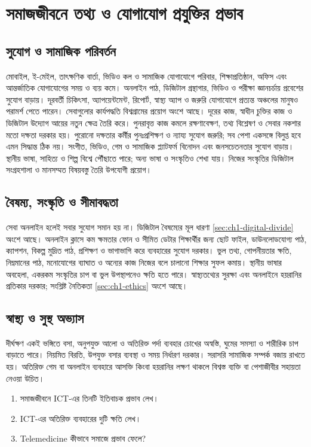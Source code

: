 \section{সমাজজীবনে তথ্য ও যোগাযোগ প্রযুক্তির প্রভাব}
\label{sec:ch1-social}
\subsection{সুযোগ ও সামাজিক পরিবর্তন}
মোবাইল, ই-মেইল, তাৎক্ষণিক বার্তা, ভিডিও কল ও সামাজিক যোগাযোগে পরিবার, শিক্ষাপ্রতিষ্ঠান, অফিস এবং আন্তর্জাতিক যোগাযোগের সময় ও ব্যয় কমে। অনলাইন পাঠ, ডিজিটাল গ্রন্থাগার, ভিডিও ও পরীক্ষা জ্ঞানচর্চায় প্রবেশের সুযোগ বাড়ায়। দূরবর্তী চিকিৎসা, অ্যাপয়েন্টমেন্ট, রিপোর্ট, স্বাস্থ্য অ্যাপ ও জরুরি যোগাযোগে প্রত্যন্ত অঞ্চলের মানুষও পরামর্শ পেতে পারেন। সেবাগুলোর কার্যপদ্ধতি বিশ্বগ্রামের প্রয়োগ অংশে আছে।
দূরের কাজ, স্বাধীন চুক্তির কাজ ও ডিজিটাল উদ্যোগ আয়ের নতুন ক্ষেত্র তৈরি করে। পুনরাবৃত্ত কাজ কমলে রক্ষণাবেক্ষণ, তথ্য বিশ্লেষণ ও সেবার নকশার মতো দক্ষতা দরকার হয়। পুরোনো দক্ষতার কর্মীর পুনঃপ্রশিক্ষণ ও ন্যায্য সুযোগ জরুরি; সব পেশা একসঙ্গে বিলুপ্ত হবে এমন সিদ্ধান্ত ঠিক নয়।
সংগীত, ভিডিও, গেম ও সামাজিক প্ল্যাটফর্ম বিনোদন এবং জনসচেতনতার সুযোগ বাড়ায়। স্থানীয় ভাষা, সাহিত্য ও শিল্প বিশ্বে পৌঁছাতে পারে; অন্য ভাষা ও সংস্কৃতিও শেখা যায়। নিজের সংস্কৃতির ডিজিটাল সংগ্রহশালা ও মানসম্মত বিষয়বস্তু তৈরি উপযোগী প্রয়োগ।
\subsection{বৈষম্য, সংস্কৃতি ও সীমাবদ্ধতা}
সেবা অনলাইন হলেই সবার সুযোগ সমান হয় না। ডিজিটাল বৈষম্যের মূল ধারণা \ref{sec:ch1-digital-divide} অংশে আছে। অনলাইন ক্লাসে কম ক্ষমতার ফোন ও সীমিত ডেটার শিক্ষার্থীর জন্য ছোট ফাইল, ডাউনলোডযোগ্য পাঠ, ক্যাপশন, বিকল্প মুদ্রিত পাঠ, প্রশিক্ষণ ও ভাগাভাগি করে ব্যবহারের সুযোগ দরকার।
ভুল তথ্য, গোপনীয়তার ক্ষতি, নিম্নমানের পাঠ, মনোযোগের ব্যাঘাত ও অন্যের কাজ নিজের বলে চালানো শিক্ষার সুফল কমায়। স্থানীয় ভাষার অবহেলা, একরকম সংস্কৃতির চাপ বা ভুল উপস্থাপনেও ক্ষতি হতে পারে। স্বাস্থ্যতথ্যের সুরক্ষা এবং অনলাইনে হয়রানির প্রতিকার দরকার; সংশ্লিষ্ট নৈতিকতা \ref{sec:ch1-ethics} অংশে আছে।
\subsection{স্বাস্থ্য ও সুস্থ অভ্যাস}
দীর্ঘক্ষণ একই ভঙ্গিতে বসা, অনুপযুক্ত আলো ও অতিরিক্ত পর্দা ব্যবহার চোখের অস্বস্তি, ঘুমের সমস্যা ও শারীরিক চাপ বাড়াতে পারে। নিয়মিত বিরতি, উপযুক্ত বসার ব্যবস্থা ও সময় নির্ধারণ দরকার। সরাসরি সামাজিক সম্পর্ক বজায় রাখতে হয়। অতিরিক্ত গেম বা অনলাইন ব্যবহারে আসক্তি কিংবা হয়রানির লক্ষণ থাকলে বিশ্বস্ত ব্যক্তি বা পেশাজীবীর সহায়তা নেওয়া উচিত।
\begin{practicebox}
\begin{enumerate}
\item সমাজজীবনে ICT-এর তিনটি ইতিবাচক প্রভাব লেখ।
\item ICT-এর অতিরিক্ত ব্যবহারের দুটি ক্ষতি লেখ।
\item Telemedicine কীভাবে সমাজে প্রভাব ফেলে?
\end{enumerate}
\end{practicebox}
